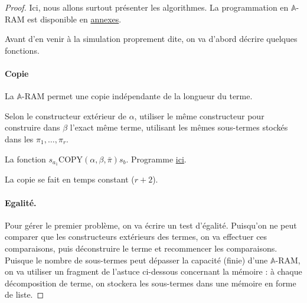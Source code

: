 \documentclass{report}
\newcommand{\bbA}{\mathbb{A}}
\begin{document}
				\begin{proof}
					Ici, nous allons surtout présenter les algorithmes. La programmation en $\bbA$-RAM est disponible en \hyperref[sec:annexes_programmes]{annexes}.
					
					Avant d'en venir à la simulation proprement dite, on va d'abord décrire quelques fonctions.
			
					
					\paragraph{Copie}
					
					La $\bbA$-RAM permet une copie indépendante de la longueur du terme. 
					
					\espace 
					
					\begin{algorithm}[H]
						\label{algo:A_RAM_fn_COPY}
						
							
						Selon le constructeur extérieur de $\alpha$, utiliser le même constructeur pour construire dans $\beta$ l'exact même terme, utilisant les mêmes sous-termes stockés dans les $\pi_1, \dots, \pi_r$.
						
						\caption{La fonction $s_{a_1}\text{COPY}(\alpha, \beta, \bar{\pi}) s_b$. Programme \hyperref[prog:A_RAM_fn_COPY]{ici}.}
					\end{algorithm}
						
					\espace
					
					La copie se fait en temps constant ($r+2$).
					
	
					\paragraph{Egalité.}
					Pour gérer le premier problème, on va écrire un test d'égalité. Puisqu'on ne peut comparer que les constructeurs extérieurs des termes, on va effectuer ces comparaisons, puis déconstruire le terme et recommencer les comparaisons. Puisque le nombre de sous-termes peut dépasser la capacité (finie) d'une $\bbA$-RAM, on va utiliser un fragment de l'astuce ci-dessous concernant la mémoire : à chaque décomposition de terme, on stockera les sous-termes dans une mémoire en forme de liste. 
	

\end{proof}
\end{document}
